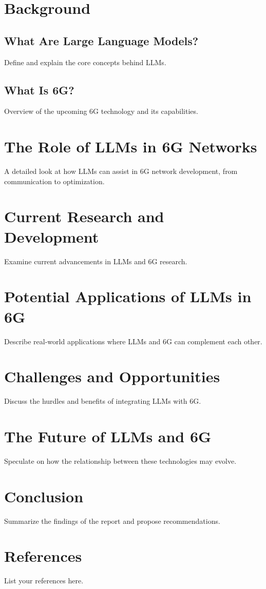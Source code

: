 \documentclass[12pt]{article}
\begin{document}
\section{Background}
\subsection{What Are Large Language Models?}
Define and explain the core concepts behind LLMs.

\subsection{What Is 6G?}
Overview of the upcoming 6G technology and its capabilities.

\section{The Role of LLMs in 6G Networks}
A detailed look at how LLMs can assist in 6G network development, from communication to optimization.

\section{Current Research and Development}
Examine current advancements in LLMs and 6G research.

\section{Potential Applications of LLMs in 6G}
Describe real-world applications where LLMs and 6G can complement each other.

\section{Challenges and Opportunities}
Discuss the hurdles and benefits of integrating LLMs with 6G.

\section{The Future of LLMs and 6G}
Speculate on how the relationship between these technologies may evolve.

\section{Conclusion}
Summarize the findings of the report and propose recommendations.

\newpage
\section*{References}
List your references here.
\end{document}

